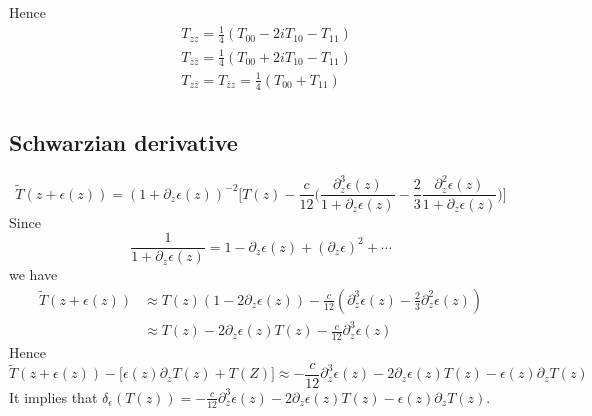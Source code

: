 \documentclass[11pt,a4paper]{article}
\theoremstyle{definition}
\begin{document}
	Hence 
	\[
	\begin{aligned}
	&T_{zz} = \frac{1}{4} (T_{00} - 2i T_{10} - T_{11})\\
	&T_{\bar{z} \bar{z}} = \frac{1}{4} (T_{00} +2i T_{10} - T_{11})\\
	&T_{z\bar{z}} =T_{\bar{z}z}= \frac{1}{4} (T_{00} + T_{11})\\
	\end{aligned}
	\]
\subsection{Schwarzian derivative}
\[
\tilde{T}(z+\epsilon(z)) = (1+ \partial_z \epsilon(z))^{-2}\Big[T(z)- \frac{c}{12}\big(\frac{\partial_z^3\epsilon(z)}{1+\partial_z\epsilon(z)}-\frac{2}{3} \frac{\partial_z^2 \epsilon(z)}{1+\partial_z \epsilon(z)}\big)\Big]
\]
Since 
\[
\frac{1}{1+\partial_z \epsilon(z)} = 1- \partial_z \epsilon(z) + (\partial_z \epsilon)^2 + \cdots
\]
we have 
\[
\begin{aligned}
\tilde{T}(z+ \epsilon(z)) &\approx T(z)(1-2\partial_z \epsilon(z)) - \frac{c}{12} (\partial^3_z \epsilon(z) - \frac{2}{3} \partial^2_z \epsilon(z))\\
& \approx T(z) - 2 \partial_z\epsilon(z) T(z) - \frac{c}{12}\partial^3_z\epsilon(z)
\end{aligned}
\]
Hence
\[
\tilde{T}(z+ \epsilon(z)) - \big[\epsilon(z)\partial_z T(z) +T(Z)\big] \approx -\frac{c}{12} \partial^3_z\epsilon(z) - 2 \partial_z\epsilon(z)T(z) -\epsilon(z)\partial_z T(z) 
\]
It implies that $\delta_\epsilon(T(z)) = -\frac{c}{12} \partial^3_z\epsilon(z) - 2 \partial_z\epsilon(z)T(z) -\epsilon(z)\partial_z T(z) $.
\end{document}
